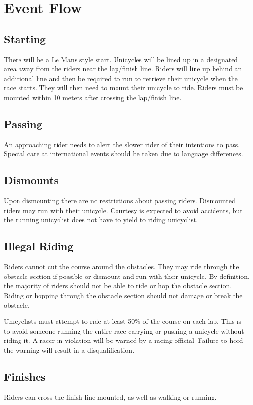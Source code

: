 \section{Event Flow}

\subsection{Starting}

There will be a Le Mans style start.
Unicycles will be lined up in a designated area away from the riders near the lap/finish line.
Riders will line up behind an additional line and then be required to run to retrieve their unicycle when the race starts.
They will then need to mount their unicycle to ride.
Riders must be mounted within 10 meters after crossing the lap/finish line.

\subsection{Passing}

An approaching rider needs to alert the slower rider of their intentions to pass.
Special care at international events should be taken due to language differences.

\subsection{Dismounts}

Upon dismounting there are no restrictions about passing riders.
Dismounted riders may run with their unicycle.
Courtesy is expected to avoid accidents, but the running unicyclist does not have to yield to riding unicyclist.

\subsection{Illegal Riding}

Riders cannot cut the course around the obstacles.
They may ride through the obstacle section if possible or dismount and run with their unicycle.
By definition, the majority of riders should not be able to ride or hop the obstacle section.
Riding or hopping through the obstacle section should not damage or break the obstacle.

Unicyclists must attempt to ride at least 50\% of the course on each lap.
This is to avoid someone running the entire race carrying or pushing a unicycle without riding it.
A racer in violation will be warned by a racing official.
Failure to heed the warning will result in a disqualification.

\subsection{Finishes}

Riders can cross the finish line mounted, as well as walking or running.

